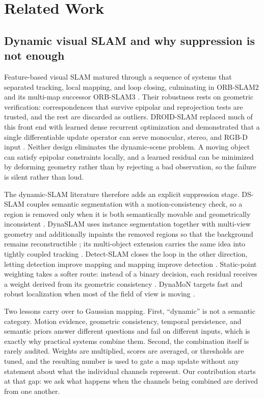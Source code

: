 \documentclass[10pt,conference]{IEEEtran}
\begin{document}
\section{Related Work}
\subsection{Dynamic visual SLAM and why suppression is not enough}
Feature-based visual SLAM matured through a sequence of systems that separated tracking, local mapping, and loop closing, culminating in ORB-SLAM2 and its multi-map successor ORB-SLAM3 \cite{murartal2017orbslam2,campos2021orb}. Their robustness rests on geometric verification: correspondences that survive epipolar and reprojection tests are trusted, and the rest are discarded as outliers. DROID-SLAM replaced much of this front end with learned dense recurrent optimization and demonstrated that a single differentiable update operator can serve monocular, stereo, and RGB-D input \cite{teed2021droid}. Neither design eliminates the dynamic-scene problem. A moving object can satisfy epipolar constraints locally, and a learned residual can be minimized by deforming geometry rather than by rejecting a bad observation, so the failure is silent rather than loud.

The dynamic-SLAM literature therefore adds an explicit suppression stage. DS-SLAM couples semantic segmentation with a motion-consistency check, so a region is removed only when it is both semantically movable and geometrically inconsistent \cite{yu2018dsslam}. DynaSLAM uses instance segmentation together with multi-view geometry and additionally inpaints the removed regions so that the background remains reconstructible \cite{bescos2018dynaslam}; its multi-object extension carries the same idea into tightly coupled tracking \cite{bescos2021dynaslam2}. Detect-SLAM closes the loop in the other direction, letting detection improve mapping and mapping improve detection \cite{zhong2018detectslam}. Static-point weighting takes a softer route: instead of a binary decision, each residual receives a weight derived from its geometric consistency \cite{kim2018staticweight}. DynaMoN targets fast and robust localization when most of the field of view is moving \cite{ballester2025dynamon}.

Two lessons carry over to Gaussian mapping. First, ``dynamic'' is not a semantic category. Motion evidence, geometric consistency, temporal persistence, and semantic priors answer different questions and fail on different inputs, which is exactly why practical systems combine them. Second, the combination itself is rarely audited. Weights are multiplied, scores are averaged, or thresholds are tuned, and the resulting number is used to gate a map update without any statement about what the individual channels represent. Our contribution starts at that gap: we ask what happens when the channels being combined are derived from one another.
\end{document}
